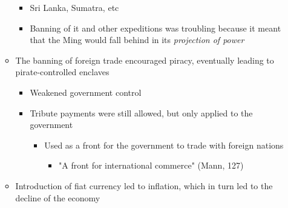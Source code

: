 \documentclass[letterpaper]{article}
\begin{document}
\begin{itemize}
\begin{itemize}
\begin{itemize}
\item Sri Lanka, Sumatra, etc
\item Banning of it and other expeditions was troubling because it meant
that the Ming would fall behind in its \emph{projection of power}
\end{itemize}

\item The banning of foreign trade encouraged piracy, eventually leading
to pirate-controlled enclaves

\begin{itemize}
\item Weakened government control
\item Tribute payments were still allowed, but only applied to the
government

\begin{itemize}
\item Used as a front for the government to trade with foreign nations

\begin{itemize}
\item "A front for international commerce" (Mann, 127)
\end{itemize}
\end{itemize}
\end{itemize}

\item Introduction of fiat currency led to inflation, which in turn led to
the decline of the economy
\end{itemize}
\end{itemize}
\end{document}
